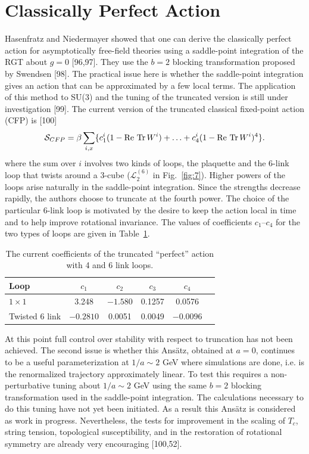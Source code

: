 \section{Classically Perfect Action}

Hasenfratz and Niedermayer showed that one can derive the classically
perfect action for asymptotically free-field theories using a
saddle-point integration of the RGT about $g = 0$ [96,97].  They use the
$b = 2$ blocking transformation proposed by Swendsen [98].  The
practical issue here is whether the saddle-point integration gives an
action that can be approximated by a few local terms.  The application
of this method to SU(3) and the tuning of the truncated version is
still under investigation [99].  The current version of the truncated
classical fixed-point action (CFP) is [100]
\begin{equation}
\mathcal{S}_{CFP} = \beta\sum_{i,x}\{c_1^i(1 - \mathrm{Re}\,\Tr W^i)
    + \ldots + c_4^i(1 - \mathrm{Re}\,\Tr W^i)^4\}.
\label{eq:Perfectaction}
\end{equation}
where the sum over $i$ involves two kinds of loops, the plaquette and
the 6-link loop that twists around a 3-cube ($\mathcal{L}_2^{(6)}$ in
Fig.~\ref{fig:7}).  Higher powers of the loops arise naturally in the
saddle-point integration.  Since the strengths decrease rapidly, the
authors choose to truncate at the fourth power.  The choice of the
particular 6-link loop is motivated by the desire to keep the action
local in time and to help improve rotational invariance.  The values of
coefficients $c_1$--$c_4$ for the two types of loops are given in
Table~\ref{tab:5}.

\begin{table}[htbp]
\centering
\begin{tabular}{lccccc}
\toprule
Loop & $c_1$ & $c_2$ & $c_3$ & $c_4$\\
\midrule
$1\times1$        & 3.248   & $-1.580$ & 0.1257  & 0.0576\\
Twisted 6 link    & $-0.2810$ & 0.0051 & 0.0049  & $-0.0096$\\
\bottomrule
\end{tabular}
\caption{The current coefficients of the truncated ``perfect'' action
with 4 and 6 link loops.}
\label{tab:5}
\end{table}

At this point full control over stability with respect to truncation
has not been achieved.  The second issue is whether this Ans\"atz,
obtained at $a = 0$, continues to be a useful parameterization at
$1/a \sim 2$ GeV where simulations are done, i.e. is the renormalized
trajectory approximately linear.  To test this requires a
non-perturbative tuning about $1/a \sim 2$ GeV using the same $b = 2$
blocking transformation used in the saddle-point integration.  The
calculations necessary to do this tuning have not yet been initiated.
As a result this Ans\"atz is considered as work in progress.
Nevertheless, the tests for improvement in the scaling of $T_c$, string
tension, topological susceptibility, and in the restoration of
rotational symmetry are already very encouraging [100,52].

